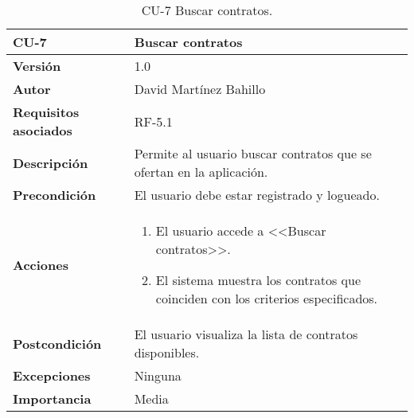 \begin{table}[p]
	\centering
	\begin{tabularx}{\linewidth}{ p{} p{} }
		\toprule
		\textbf{CU-7}    & \textbf{Buscar contratos}\\
		\midrule
		\textbf{Versión}              & 1.0    \\
		\textbf{Autor}                & David Martínez Bahillo \\
		\textbf{Requisitos asociados} & RF-5.1 \\
		\textbf{Descripción}          & Permite al usuario buscar contratos que se ofertan en la aplicación. \\
		\textbf{Precondición}         & El usuario debe estar registrado y logueado. \\
		\textbf{Acciones}             &
		\begin{enumerate}
			\def\labelenumi{\arabic{enumi}.}
			\tightlist
			\item El usuario accede a <<Buscar contratos>>.
			\item El sistema muestra los contratos que coinciden con los criterios especificados.
		\end{enumerate}\\
		\textbf{Postcondición}        & El usuario visualiza la lista de contratos disponibles. \\
		\textbf{Excepciones}          & Ninguna \\
		\textbf{Importancia}          & Media \\
		\bottomrule
	\end{tabularx}
	\caption{CU-7 Buscar contratos.}
\end{table}


